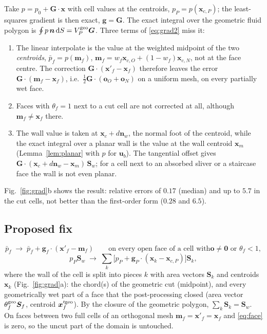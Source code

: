 \documentclass[11pt,a4paper]{article}
\theoremstyle{remark}
\newcommand{\uu}{\bm{u}}
\newcommand{\ub}{\uu_b}
\newcommand{\nn}{\bm{n}}
\newcommand{\xx}{\bm{x}}
\newcommand{\Sf}{\bm{S}_f}
\newcommand{\Sw}{\bm{S}_w}
\newcommand{\dd}{\,\mathrm{d}}
\begin{document}
Take $p=p_0+\bm G\cdot\xx$ with cell values at the centroids, $p_P=p(\xx_{c,P})$; the
least-squares gradient is then exact, $\bm g=\bm G$. The exact integral over the geometric fluid
polygon is $\oint p\,\nn\dd S=V^{\rm geo}_P\bm G$. Three terms of \eqref{eq:grad2} miss it:
\begin{enumerate}\itemsep1pt
\item The linear interpolate is the value at the weighted midpoint of the two \emph{centroids},
      $\bar p_f=p(\bm m_f)$, $\bm m_f=w_f\xx_{c,O}+(1-w_f)\xx_{c,N}$, not at the face centre. The
      correction $\bm G\cdot(\xx'_f-\xx_f)$ therefore leaves the error $\bm G\cdot(\bm m_f-\xx_f)$,
      i.e.\ $\tfrac12\bm G\cdot(\bm o_O+\bm o_N)$ on a uniform mesh, on every partially wet face.
\item Faces with $\theta_f=1$ next to a cut cell are not corrected at all, although
      $\bm m_f\neq\xx_f$ there.
\item The wall value is taken at $\xx_c+d\nn_w$, the normal foot of the centroid, while the exact
      integral over a planar wall is the value at the wall centroid $\xx_m$ (Lemma~\ref{lem:planar}
      with $p$ for $\ub$). The tangential offset gives $\bm G\cdot(\xx_c+d\nn_w-\xx_m)\,\Sw$; for a
      cell next to an absorbed sliver or a staircase face the wall is not even planar.
\end{enumerate}
Fig.~\ref{fig:grad}b shows the result: relative errors of $0.17$ (median) and up to $5.7$ in the
cut cells, not better than the first-order form ($0.28$ and $6.5$).

\subsection{Proposed fix}

\begin{equation}
\bar p_f\;\to\;\bar p_f+\bm g_f\cdot(\xx'_f-\bm m_f)\qquad\text{on every open face of a cell with
}\bm o\neq\bm 0\text{ or }\theta_f<1,
\label{eq:face}
\end{equation}
\begin{equation}
p_P\Sw\;\to\;\sum_k\big[p_P+\bm g_P\cdot(\xx_k-\xx_{c,P})\big]\bm S_k ,
\label{eq:wall}
\end{equation}
where the wall of the cell is split into pieces $k$ with area vectors $\bm S_k$ and centroids
$\xx_k$ (Fig.~\ref{fig:grad}a): the chord(s) of the geometric cut (midpoint), and every
geometrically wet part of a face that the post-processing closed (area vector
$\theta^{\rm geo}_f\Sf$, centroid $\xx'^{\rm geo}_f$). By the closure of the geometric polygon,
$\sum_k\bm S_k=\Sw$. On faces between two full cells of an orthogonal mesh $\bm m_f=\xx'_f=\xx_f$
and \eqref{eq:face} is zero, so the uncut part of the domain is untouched.
\end{document}
